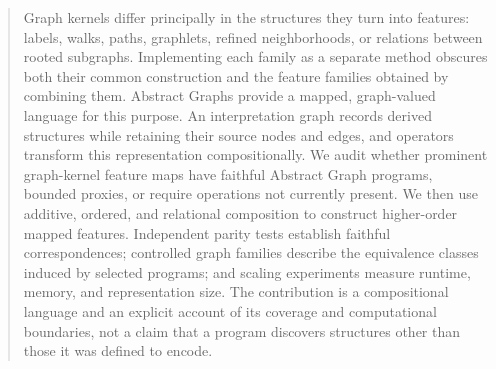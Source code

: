 \begin{abstract}
Graph kernels differ principally in the structures they turn into features:
labels, walks, paths, graphlets, refined neighborhoods, or relations between
rooted subgraphs. Implementing each family as a separate method obscures both
their common construction and the feature families obtained by combining them.
Abstract Graphs provide a mapped, graph-valued language for this purpose. An
interpretation graph records derived structures while retaining their source
nodes and edges, and operators transform this representation compositionally.
We audit whether prominent graph-kernel feature maps have faithful Abstract
Graph programs, bounded proxies, or require operations not currently present.
We then use additive, ordered, and relational composition to construct
higher-order mapped features. Independent parity tests establish faithful
correspondences; controlled graph families describe the equivalence classes
induced by selected programs; and scaling experiments measure runtime, memory,
and representation size. The contribution is a compositional language and an
explicit account of its coverage and computational boundaries, not a claim
that a program discovers structures other than those it was defined to encode.
\end{abstract}
